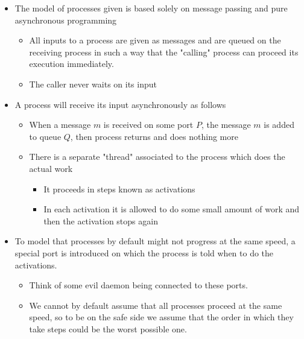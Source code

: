 \documentclass[11pt]{article}
\begin{document}
\begin{itemize}
\item The model of processes given is based solely on message passing and pure asynchronous programming
\begin{itemize}
\item All inputs to a process are given as messages and are queued on the receiving process in such a way that the "calling" process can proceed its execution immediately.
\item The caller never waits on its input
\end{itemize}

\item A process will receive its input asynchronously as follows
\begin{itemize}
\item When a message \(m\) is received on some port \(P\), the message \(m\) is added to queue \(Q\), then process returns and does nothing more
\item There is a separate "thread" associated to the process which does the actual work
\begin{itemize}
\item It proceeds in steps known as activations
\item In each activation it is allowed to do some small amount of work and then the activation stops again
\end{itemize}
\end{itemize}

\item To model that processes by default might not progress at the same speed, a special port is introduced on which the process is told when to do the activations.
\begin{itemize}
\item Think of some evil daemon being connected to these ports.
\item We cannot by default assume that all processes proceed at the same speed, so to be on the safe side we assume that the order in which they take steps could be the worst possible one.
\end{itemize}
\end{itemize}
\end{document}
